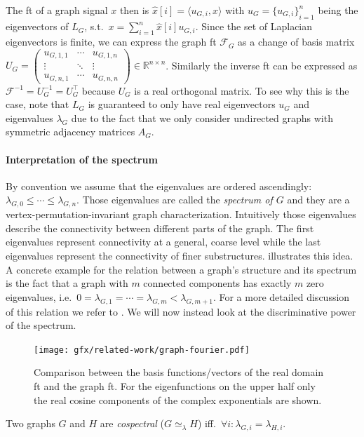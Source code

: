 The \ac{ft} of a graph signal $x$ then is $\hat{x}[i] = \langle u_{G,i}, x \rangle$ with $u_G = {\{ u_{G,i} \}}_{i=1}^{n}$ being the eigenvectors of $L_G$, s.t.\ $x = \sum_{i=1}^n \hat{x}[i] u_{G,i}$.
Since the set of Laplacian eigenvectors is finite, we can express the graph \ac{ft} $\mathcal{F}_G$ as a change of basis matrix $U_G = \begin{pmatrix} u_{G,1,1} & \cdots & u_{G,1,n} \\ \vdots & \ddots & \vdots \\ u_{G,n,1} & \cdots & u_{G,n,n} \end{pmatrix} \in \mathbb{R}^{n \times n}$.
Similarly the inverse \ac{ft} can be expressed as $\mathcal{F}^{-1} = U_G^{-1} = U_G^{\top}$ because $U_G$ is a real orthogonal matrix.
To see why this is the case, note that $L_G$ is guaranteed to only have real eigenvectors $u_G$ and eigenvalues $\lambda_G$ due to the fact that we only consider undirected graphs with symmetric adjacency matrices $A_G$.

\paragraph{Interpretation of the spectrum}
By convention we assume that the eigenvalues are ordered ascendingly: $\lambda_{G,0} \leq \cdots \leq \lambda_{G,n}$.
Those eigenvalues are called the \textit{spectrum of $G$} and they are a vertex-permutation-invariant graph characterization.
Intuitively those eigenvalues describe the connectivity between different parts of the graph.
The first eigenvalues represent connectivity at a general, coarse level while the last eigenvalues represent the connectivity of finer substructures.
 illustrates this idea.
A concrete example for the relation between a graph's structure and its spectrum is the fact that a graph with $m$ connected components has exactly $m$ zero eigenvalues, i.e.\ $0 = \lambda_{G,1} = \cdots = \lambda_{G,m} < \lambda_{G,m+1}$.
For a more detailed discussion of this relation we refer to \citet{Das2004}.
We will now instead look at the discriminative power of the spectrum.
\begin{figure}[ht]
	\centering
	\texttt{[image: gfx/related-work/graph-fourier.pdf]}
	\caption[Comparison between the basis vectors of the real domain \acl{ft} and the graph \acl{ft}.]{
		Comparison between the basis functions/vectors of the real domain \ac{ft} and the graph \ac{ft}.
		For the eigenfunctions on the upper half only the real cosine components of the complex exponentials are shown.
	}\label{fig:related:graph-fourier}
\end{figure}
\begin{defn}
	Two graphs $G$ and $H$ are \textit{cospectral} ($G \mathrel{\simeq_\lambda} H$) iff.\ $\forall i: \lambda_{G,i} = \lambda_{H,i}$.
\end{defn}

